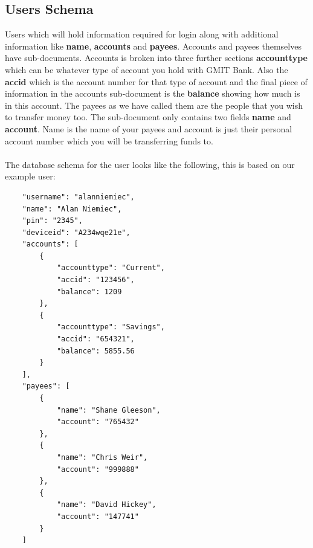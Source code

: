 \subsection{Users Schema}
 Users which will hold information required for login along with additional information like \textbf{name}, \textbf{accounts} and \textbf{payees}. Accounts and payees themselves have sub-documents. Accounts is broken into three further sections \textbf{accounttype} which can be whatever type of account you hold with GMIT Bank. Also the \textbf{accid} which is the account number for that type of account and the final piece of information in the accounts sub-document is the \textbf{balance} showing how much is in this account. The payees as we have called them are the people that you wish to transfer money too. The sub-document only contains two fields \textbf{name} and \textbf{account}. Name is the name of your payees and account is just their personal account number which you will be transferring funds to. \paragraph{} 
 
The database schema for the user looks like the following, this is based on our example user:
\begin{verbatim}
    "username": "alanniemiec",
    "name": "Alan Niemiec",
    "pin": "2345",
    "deviceid": "A234wqe21e",
    "accounts": [
        {
            "accounttype": "Current",
            "accid": "123456",
            "balance": 1209
        },
        {
            "accounttype": "Savings",
            "accid": "654321",
            "balance": 5855.56
        }
    ],
    "payees": [
        {
            "name": "Shane Gleeson",
            "account": "765432"
        },
        {
            "name": "Chris Weir",
            "account": "999888"
        },
        {
            "name": "David Hickey",
            "account": "147741"
        }
    ]
\end{verbatim}

